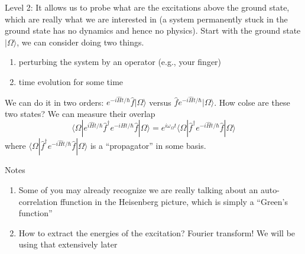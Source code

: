 Level 2: It allows us to probe what are the excitations above the ground state, which are really what we are interested in (a system permanently stuck in the ground state has no dynamics and hence no physics). Start with the ground state $|\Omega\rangle$, we can consider doing two things.
\begin{enumerate}
    \item perturbing the system by an operator (e.g., your finger)
    \item time evolution for some time
\end{enumerate}

We can do it in two orders: $e^{-i\hat{H}t/\hbar}\hat{f}|\Omega \rangle$ versus $\hat{f}e^{-i\hat{H}t/\hbar}|\Omega \rangle$. How colse are these two states? We can measure their overlap
\[ \langle \Omega |e^{i\hat{H}t/\hbar}\hat{f}^{\dagger}e^{-i\hat{H}t/\hbar}\hat{f}|\Omega \rangle =e^{i\omega _{\Omega}t}\langle \Omega |\hat{f}^{\dagger}e^{-i\hat{H}t/\hbar}\hat{f}|\Omega \rangle \]
where $\langle \Omega |\hat{f}^{\dagger}e^{-i\hat{H}t/\hbar}\hat{f}|\Omega \rangle$ is a ``propagator'' in some basis.

Notes
\begin{enumerate}
    \item Some of you may already recognize we are really talking about an auto-correlation ffunction in the Heisenberg picture, which is simply a ``Green's function''
    \item How to extract the energies of the excitation? Fourier transform! We will be using that extensively later
\end{enumerate}

